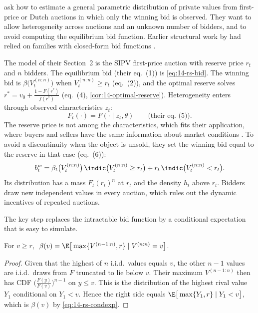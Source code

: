 \citet{LaffontOssardVuong1995} ask how to estimate a general parametric distribution of private values from
first-price or Dutch auctions in which only the winning bid is observed. They want to allow heterogeneity across
auctions and an unknown number of bidders, and to avoid computing the equilibrium bid function. Earlier structural
work by \citet{Paarsch1992} had relied on families with closed-form bid functions
\citep[p.~954]{LaffontOssardVuong1995}.

The model of their Section~2 is the SIPV first-price auction with reserve price $r_t$ and $n$ bidders. The
equilibrium bid (their eq.~(1)) is \eqref{eq:14-rs-bid}. The winning bid is $\beta\big(V_t^{(n:n)}\big)$ when
$V_t^{(n:n)}\ge r_t$ (eq.~(2)), and the optimal reserve solves $r^*=v_0+\frac{1-F(r^*)}{f(r^*)}$ (eq.~(4),
\cref{cor:14-optimal-reserve}). Heterogeneity enters through observed characteristics $z_t$:
\[
F_t(\cdot)=F(\cdot\mid z_t,\theta)\qquad\text{(their eq.~(5))}.
\]
The reserve price is not among the characteristics, which fits their application, where buyers and sellers have the
same information about market conditions \citep[p.~957]{LaffontOssardVuong1995}. To avoid a discontinuity when the
object is unsold, they set the winning bid equal to the reserve in that case (eq.~(6)):
\[
b^w_t=\beta_t\big(V_t^{(n:n)}\big)\,\indic\big(V_t^{(n:n)}\ge r_t\big)+r_t\,\indic\big(V_t^{(n:n)}<r_t\big).
\]
Its distribution has a mass $F_t(r_t)^n$ at $r_t$ and the density $h_t$ above $r_t$. Bidders draw new independent values
in every auction, which rules out the dynamic incentives of repeated auctions.

The key step replaces the intractable bid function by a conditional expectation that is easy to simulate.

\begin{lemma}\label{lem:15-lov}
For $v\ge r$, $\ \beta(v)=\E\big[\max\{V^{(n-1:n)},r\}\mid V^{(n:n)}=v\big]$.
\end{lemma}

\begin{proof}
Given that the highest of $n$ i.i.d.\ values equals $v$, the other $n-1$ values are i.i.d.\ draws from $F$ truncated
to lie below $v$. Their maximum $V^{(n-1:n)}$ then has CDF $\big(\frac{F(y)}{F(v)}\big)^{n-1}$ on $y\le v$. This is the
distribution of the highest rival value $Y_1$ conditional on $Y_1<v$. Hence the right side equals
$\E\big[\max\{Y_1,r\}\mid Y_1<v\big]$, which is $\beta(v)$ by \eqref{eq:14-rs-condexp}.
\end{proof}

